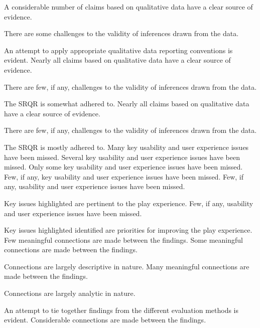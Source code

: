 \documentclass{../fal_assignment}
\begin{document}
\begin{markingrubric}
        \grade		A considerable number of claims based on qualitative data have a clear source of evidence.
        \par		There are some challenges to the validity of inferences drawn from the data.
        \par 		An attempt to apply appropriate qualitative data reporting conventions is evident.
        \grade		Nearly all claims based on qualitative data have a clear source of evidence.
        \par		There are few, if any, challenges to the validity of inferences drawn from the data.
        \par 		The SRQR is somewhat adhered to.
        \grade		Nearly all claims based on qualitative data have a clear source of evidence.
        \par		There are few, if any, challenges to the validity of inferences drawn from the data.
        \par		The SRQR is mostly adhered to.
%
        \grade\fail 	Many key usability and user experience issues have been missed.
        \grade		Several key usability and user experience issues have been missed.
        \grade		Only some key usability and user experience issues have been missed.
        \grade		Few, if any, key usability and user experience issues have been missed.
        \grade		Few, if any, usability and user experience issues have been missed.
        \par		Key issues highlighted are pertinent to the play experience.
        \grade		Few, if any, usability and user experience issues have been missed.
        \par		Key issues highlighted identified are priorities for improving the play experience.
%
        \grade \fail	Few meaningful connections are made between the findings.
        \grade 		Some meaningful connections are made between the findings.
        \par     		Connections are largely descriptive in nature.
        \grade		Many meaningful connections are made between the findings.
        \par     		Connections are largely analytic in nature.
        \par		An attempt to tie together findings from the different evaluation methods is evident.
        \grade		Considerable connections are made between the findings.

\end{markingrubric}
\end{document}
